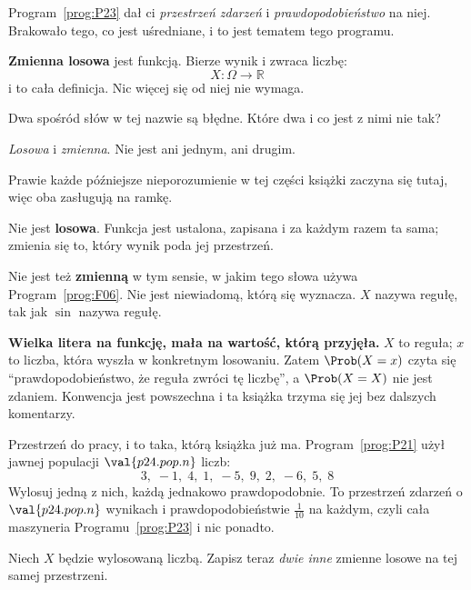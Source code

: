 \begin{fr}

Program~\ref{prog:P23} dał ci \emph{przestrzeń zdarzeń} i
\emph{prawdopodobieństwo} na niej. Brakowało tego, co jest uśredniane, i to
jest tematem tego programu.

\textbf{Zmienna losowa} jest funkcją. Bierze wynik i zwraca liczbę:
\[ X \colon \Omega \longrightarrow \mathbb{R} \]
i to cała definicja. Nic więcej się od niej nie wymaga.

Dwa spośród słów w tej nazwie są błędne. Które dwa i co jest z nimi nie tak?
\dotline
\nextframe
\end{fr}

\begin{fr}
\begin{ansblock}
\emph{Losowa} i \emph{zmienna}. Nie jest ani jednym, ani drugim.
\end{ansblock}

Prawie każde późniejsze nieporozumienie w tej części książki zaczyna się tutaj,
więc oba zasługują na ramkę.

Nie jest \textbf{losowa}. Funkcja jest ustalona, zapisana i za każdym razem ta
sama; zmienia się to, który wynik poda jej przestrzeń.

Nie jest też \textbf{zmienną} w tym sensie, w jakim tego słowa używa
Program~\ref{prog:F06}. Nie jest niewiadomą, którą się wyznacza. $X$ nazywa
regułę, tak jak $\sin$ nazywa regułę.

\begin{notationbox}
\textbf{Wielka litera na funkcję, mała na wartość, którą przyjęła.} $X$ to
reguła; $x$ to liczba, która wyszła w konkretnym losowaniu. Zatem
$\Prob(X = x)$ czyta się \enquote{prawdopodobieństwo, że reguła zwróci tę
liczbę}, a $\Prob(X = X)$ nie jest zdaniem. Konwencja jest powszechna i ta
książka trzyma się jej bez dalszych komentarzy.
\end{notationbox}
\end{fr}

\begin{fr}
Przestrzeń do pracy, i to taka, którą książka już ma.
Program~\ref{prog:P21} użył jawnej populacji $\val{p24.pop.n}$ liczb:
\[ 3,\; -1,\; 4,\; 1,\; -5,\; 9,\; 2,\; -6,\; 5,\; 8 \]
Wylosuj jedną z nich, każdą jednakowo prawdopodobnie. To przestrzeń zdarzeń o
$\val{p24.pop.n}$ wynikach i prawdopodobieństwie $\frac{1}{10}$ na każdym,
czyli cała maszyneria Programu~\ref{prog:P23} i nic ponadto.

Niech $X$ będzie wylosowaną liczbą. Zapisz teraz \emph{dwie inne} zmienne
losowe na tej samej przestrzeni.
\dotline
\nextframe
\end{fr}

